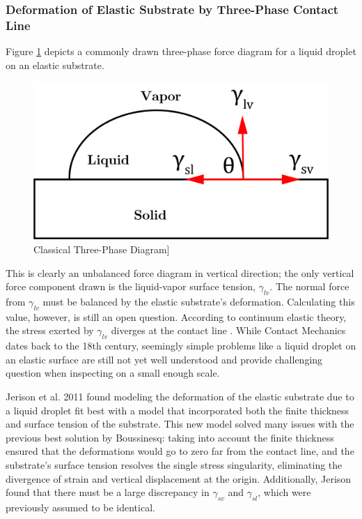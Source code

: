 \subsubsection{Deformation of Elastic Substrate by Three-Phase Contact Line}
Figure \ref{fig:three-phase} depicts a commonly drawn three-phase force diagram for a liquid droplet on an elastic substrate.
\begin{figure}[h!]
	\centering
	\includegraphics[width=.6\textwidth]{Chapters/Figures/phase_diagram.PNG}
	\caption[Three-Phase Diagram]{Classical Three-Phase Diagram]}
	\label{fig:three-phase} 
\end{figure}

This is clearly an unbalanced force diagram in vertical direction; the only vertical force component drawn is the liquid-vapor surface tension, $ \gamma_{lv} $. The normal force from $\gamma_{lv}$ must be balanced by the elastic substrate's deformation. Calculating this value, however, is still an open question. According to continuum elastic theory, the stress exerted by $\gamma_{lv}$ diverges at the contact line \cite{jerison2011deformation}. While Contact Mechanics dates back to the 18th century, seemingly simple problems like a liquid droplet on an elastic surface are still not yet well understood and provide challenging question when inspecting on a small enough scale.

Jerison et al. 2011 \cite{jerison2011deformation} found modeling the deformation of the elastic substrate due to a liquid droplet fit best with a model that incorporated both the finite thickness and surface tension of the substrate. This new model solved many issues with the previous best solution by Boussinesq: taking into account the finite thickness ensured that the deformations would go to zero far from the contact line, and the substrate's surface tension resolves the single stress singularity, eliminating the divergence of strain and vertical displacement at the origin. Additionally, Jerison found that there must be a large discrepancy in $\gamma_{sv}$ and $\gamma_{sl}$, which were previously assumed to be identical.


